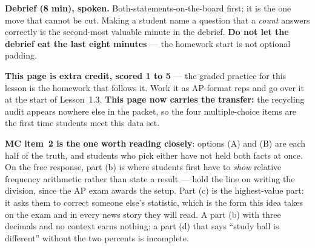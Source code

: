 \documentclass[10pt]{article}
\begin{document}
\begin{teachernote}
\textbf{Debrief (8 min), spoken.} Both-statements-on-the-board first; it is the one move that
cannot be cut. Making a student name a question that a \emph{count} answers correctly is the
second-most valuable minute in the debrief. \textbf{Do not let the debrief eat the last eight
minutes} --- the homework start is not optional padding.
\end{teachernote}

\begin{teachernote}[AP Practice]
\textbf{This page is extra credit, scored 1 to 5} --- the graded practice for this lesson is the homework that
follows it. Work it as AP-format reps and go over it at the start of Lesson~1.3. \textbf{This
page now carries the transfer:} the recycling audit appears nowhere else in the packet, so the
four multiple-choice items are the first time students meet this data set.

\textbf{MC item~2 is the one worth reading closely}: options (A) and (B) are each half of the
truth, and students who pick either have not held both facts at once. On the free response,
part (b) is where students first have to \emph{show} relative frequency arithmetic rather than
state a result --- hold the line on writing the division, since the AP exam awards the setup.
Part (c) is the highest-value part: it asks them to correct someone else's statistic, which is
the form this idea takes on the exam and in every news story they will read. A part (b) with
three decimals and no context earns nothing; a part (d) that says ``study hall is different''
without the two percents is incomplete.
\end{teachernote}
\end{document}
